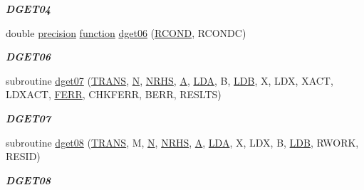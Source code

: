 \begin{DoxyCompactItemize}
\begin{DoxyCompactList}\small\item\em {\bfseries D\+G\+E\+T04} \end{DoxyCompactList}\item 
double \hyperlink{numinquire_8h_a2c8e616467665d0b2814d4c1589ba74e}{precision} \hyperlink{afunc_8m_a7b5e596df91eadea6c537c0825e894a7}{function} \hyperlink{group__double__lin_gaf9e572a79f1758d8bff55a7306ffeb27}{dget06} (\hyperlink{superlu__enum__consts_8h_af00a42ecad444bbda75cde1b64bd7e72a9b5c151728d8512307565994c89919d5}{R\+C\+O\+N\+D}, R\+C\+O\+N\+D\+C)
\begin{DoxyCompactList}\small\item\em {\bfseries D\+G\+E\+T06} \end{DoxyCompactList}\item 
subroutine \hyperlink{group__double__lin_ga2870c871ac25e58d26d843c85f4d46a2}{dget07} (\hyperlink{superlu__enum__consts_8h_a0c4e17b2d5cea33f9991ccc6a6678d62a1f61e3015bfe0f0c2c3fda4c5a0cdf58}{T\+R\+A\+N\+S}, \hyperlink{polmisc_8c_a0240ac851181b84ac374872dc5434ee4}{N}, \hyperlink{example__user_8c_aa0138da002ce2a90360df2f521eb3198}{N\+R\+H\+S}, \hyperlink{classA}{A}, \hyperlink{example__user_8c_ae946da542ce0db94dced19b2ecefd1aa}{L\+D\+A}, B, \hyperlink{example__user_8c_a50e90a7104df172b5a89a06c47fcca04}{L\+D\+B}, X, L\+D\+X, X\+A\+C\+T, L\+D\+X\+A\+C\+T, \hyperlink{superlu__enum__consts_8h_af00a42ecad444bbda75cde1b64bd7e72a78fd14d7abebae04095cfbe02928f153}{F\+E\+R\+R}, C\+H\+K\+F\+E\+R\+R, B\+E\+R\+R, R\+E\+S\+L\+T\+S)
\begin{DoxyCompactList}\small\item\em {\bfseries D\+G\+E\+T07} \end{DoxyCompactList}\item 
subroutine \hyperlink{group__double__lin_gaacaa76b1facc0b7c82e666f399e51180}{dget08} (\hyperlink{superlu__enum__consts_8h_a0c4e17b2d5cea33f9991ccc6a6678d62a1f61e3015bfe0f0c2c3fda4c5a0cdf58}{T\+R\+A\+N\+S}, M, \hyperlink{polmisc_8c_a0240ac851181b84ac374872dc5434ee4}{N}, \hyperlink{example__user_8c_aa0138da002ce2a90360df2f521eb3198}{N\+R\+H\+S}, \hyperlink{classA}{A}, \hyperlink{example__user_8c_ae946da542ce0db94dced19b2ecefd1aa}{L\+D\+A}, X, L\+D\+X, B, \hyperlink{example__user_8c_a50e90a7104df172b5a89a06c47fcca04}{L\+D\+B}, R\+W\+O\+R\+K, R\+E\+S\+I\+D)
\begin{DoxyCompactList}\small\item\em {\bfseries D\+G\+E\+T08} \end{DoxyCompactList}\item 

\end{DoxyCompactItemize}
